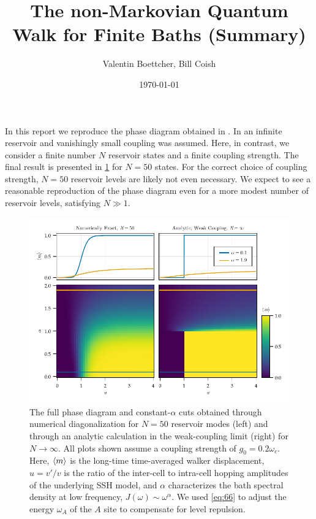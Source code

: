 \documentclass[fontsize=10pt,paper=b5,open=any,
twoside=no,toc=listof,toc=bibliography,headings=optiontohead,
captions=nooneline,captions=tableabove,english,DIV=15,numbers=noenddot,final,parskip=yes,
headinclude=true,footinclude=false,BCOR=0mm]{scrartcl}
\author{Valentin Boettcher, Bill Coish}
\title{The non-Markovian Quantum Walk for Finite Baths (Summary)}
\date{\today}
\begin{document}
\maketitle
In this report we reproduce the phase diagram obtained in
. In  an infinite
reservoir and vanishingly small coupling was assumed. Here, in
contrast, we consider a finite number \(N\) reservoir states and a
finite coupling strength. The final result is presented in
\cref{fig:example_finite_vs_continuum} for \(N=50\) states. For the
correct choice of coupling strength, \(N=50\) reservoir levels are
likely not even necessary. We expect to see a reasonable reproduction
of the phase diagram even for a more modest number of reservoir
levels, satisfying \(N\gg 1\).

\begin{figure}[H]
  \centering
  \includegraphics{plots/example_finite_vs_continuum}
  \caption{\label{fig:example_finite_vs_continuum} The full phase
    diagram and constant-\(α\) cuts obtained through numerical
    diagonalization for \(N=50\) reservoir modes (left) and through an
    analytic calculation in the weak-coupling limit (right) for
    \(N\to ∞\). All plots shown assume a coupling strength of
    \(g_{0}=0.2 ω_{c}\). Here, \(\ev{m}\) is the long-time
    time-averaged walker displacement, \(u=v\prime/v\) is the ratio of
    the inter-cell to intra-cell hopping amplitudes of the underlying
    SSH model, and \(α\) characterizes the bath spectral density at
    low frequency, \(J(ω)\sim ω^{α}\). We used \cref{eq:66} to adjust
    the energy \(ω_{A}\) of the \(A\) site to compensate for level
    repulsion.}
\end{figure}
\end{document}
